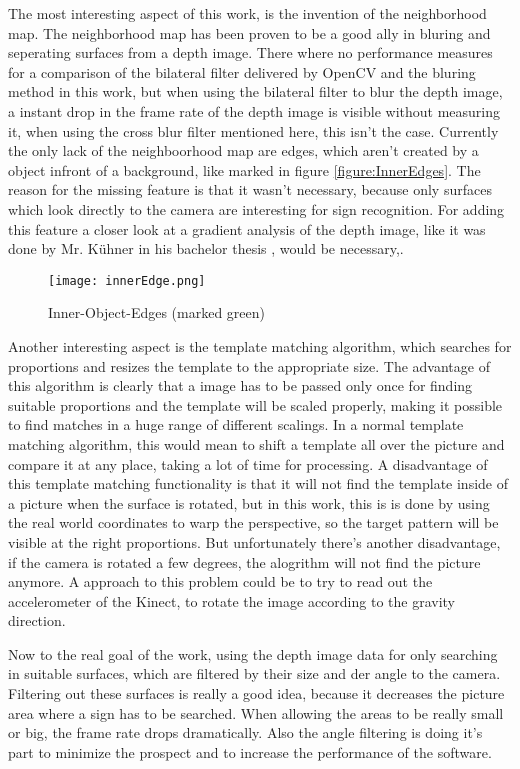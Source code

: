 The most interesting aspect of this work, is the invention of the neighborhood map. The neighborhood map has been proven
to be a good ally in bluring and seperating surfaces from a depth image. There where no performance
measures for a comparison of the bilateral filter delivered by OpenCV and the bluring method in this work,
but when using the bilateral filter to blur the depth image, a instant drop in the frame rate of the depth image is visible
without measuring it, when using the cross blur filter mentioned here, this isn't the case. Currently the only lack
of the neighboorhood map are edges, which aren't created by a object infront of a background, like marked in figure \vref{figure:InnerEdges}.
The reason for the missing feature is that it wasn't necessary, because only surfaces which look directly to the camera 
are interesting for sign recognition. For adding this feature a closer look at a gradient analysis of the depth image,
like it was done by Mr. Kühner in his bachelor thesis \cite{max:recog}, would be necessary,.

\begin{figure}[H]
\begin{center}
  \texttt{[image: innerEdge.png]}
  \caption{Inner-Object-Edges (marked green)}
  \label{figure:InnerEdges}
\end{center}
\end{figure}

Another interesting aspect is the template matching algorithm, which searches for proportions and resizes the
template to the appropriate size. The advantage of this algorithm is clearly that a image has to be passed
only once for finding suitable proportions and the template will be scaled properly, making it possible
to find matches in a huge range of different scalings. In a normal template matching algorithm,
this would mean to shift a template all over the picture and compare it at any place, taking a lot
of time for processing. A disadvantage of this template matching functionality is that it will not
find the template inside of a picture when the surface is rotated, but in this work, this is
is done by using the real world coordinates to warp the perspective, so the target pattern
will be visible at the right proportions. But unfortunately there's another disadvantage,
if the camera is rotated a few degrees, the alogrithm will not find the picture anymore.
A approach to this problem could be to try to read out the accelerometer of the Kinect,
to rotate the image according to the gravity direction.

Now to the real goal of the work, using the depth image data for only searching in suitable surfaces,
which are filtered by their size and der angle to the camera. Filtering out these surfaces
is really a good idea, because it decreases the picture area where a sign has to be searched.
When allowing the areas to be really small or big, the frame rate drops dramatically. Also
the angle filtering is doing it's part to minimize the prospect and to increase the performance
of the software.